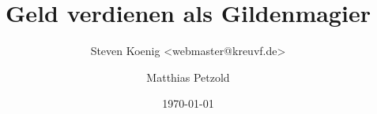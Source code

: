 \title{Geld verdienen als Gildenmagier}
\author{Steven Koenig <webmaster@kreuvf.de>\and Matthias Petzold}
\date{\today}
\maketitle

